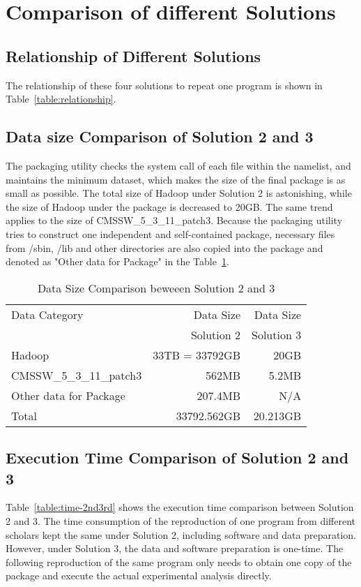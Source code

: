 \documentclass{acm_proc_article-sp}
\begin{document}
\section{Comparison of different Solutions}
\subsection{Relationship of Different Solutions}
The relationship of these four solutions to repeat one program is shown in Table~\ref{table:relationship}.

\subsection{ Data size Comparison of Solution 2 and 3}
The packaging utility checks the system call of each file within the namelist, and maintains the minimum dataset, which makes the size of the final package is as small as possible. The total size of Hadoop under Solution 2 is astonishing, while the size of Hadoop under the package is decreased to 20GB. The same trend applies to the size of CMSSW\_5\_3\_11\_patch3. Because the packaging utility tries to construct one independent and self-contained package, necessary files  from /sbin, /lib and other directories are also copied into the package and denoted as "Other data for Package" in the Table~\ref{table:datasize-2nd3rd}.

\begin{table}
    \centering
    \begin{tabular}{|l|r|r|}
    \hline
     Data Category & Data Size & Data Size \\
    & Solution 2 & Solution 3\\ \hline
    Hadoop & 33TB = 33792GB & 20GB \\ \hline
     CMSSW\_5\_3\_11\_patch3 & 562MB & 5.2MB \\ \hline
     Other data for Package & 207.4MB & N/A \\ \hline
     Total & 33792.562GB & 20.213GB \\ \hline
    \end{tabular}
    \caption{Data Size Comparison beweeen Solution 2 and 3}
    \label{table:datasize-2nd3rd}
\end{table}

\subsection{Execution Time Comparison of Solution 2 and 3}
Table~\ref{table:time-2nd3rd} shows the execution time comparison between Solution 2 and 3. The time consumption of the reproduction of one program from different scholars kept the same under Solution 2, including software and data preparation. However, under Solution 3, the data and software preparation is one-time. The following reproduction of the same program only needs to obtain one copy of the package and execute the actual experimental analysis directly.
\end{document}
